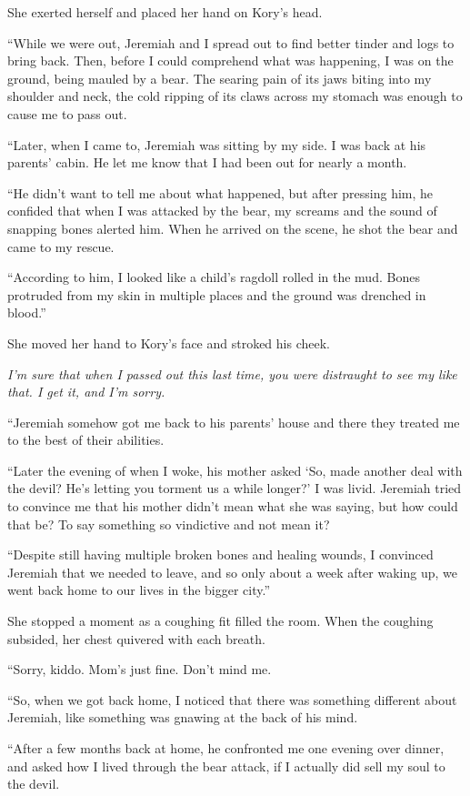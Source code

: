 She exerted herself and placed her hand on Kory's head.

``While we were out, Jeremiah and I spread out to find better tinder and logs to bring back. Then, before I could comprehend what was happening, I was on the ground, being mauled by a bear. The searing pain of its jaws biting into my shoulder and neck, the cold ripping of its claws across my stomach was enough to cause me to pass out.

``Later, when I came to, Jeremiah was sitting by my side. I was back at his parents' cabin. He let me know that I had been out for nearly a month.

``He didn't want to tell me about what happened, but after pressing him, he confided that when I was attacked by the bear, my screams and the sound of snapping bones alerted him. When he arrived on the scene, he shot the bear and came to my rescue.

``According to him, I looked like a child's ragdoll rolled in the mud. Bones protruded from my skin in multiple places and the ground was drenched in blood.''

She moved her hand to Kory's face and stroked his cheek.

\textit{I'm sure that when I passed out this last time, you were distraught to see my like that. I get it, and I'm sorry.}

``Jeremiah somehow got me back to his parents' house and there they treated me to the best of their abilities.

``Later the evening of when I woke, his mother asked `So, made another deal with the devil? He's letting you torment us a while longer?' I was livid. Jeremiah tried to convince me that his mother didn't mean what she was saying, but how could that be? To say something so vindictive and not mean it?

``Despite still having multiple broken bones and healing wounds, I convinced Jeremiah that we needed to leave, and so only about a week after waking up, we went back home to our lives in the bigger city.''

She stopped a moment as a coughing fit filled the room. When the coughing subsided, her chest quivered with each breath.

``Sorry, kiddo. Mom's just fine. Don't mind me.

``So, when we got back home, I noticed that there was something different about Jeremiah, like something was gnawing at the back of his mind.

``After a few months back at home, he confronted me one evening over dinner, and asked how I lived through the bear attack, if I actually did sell my soul to the devil.

